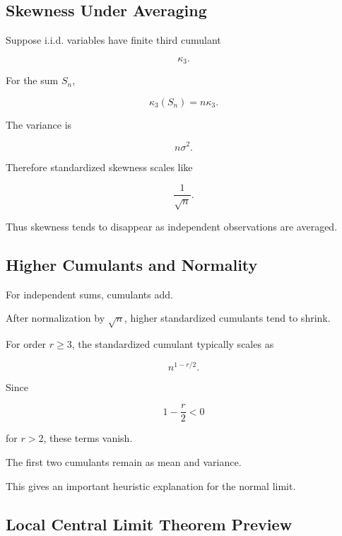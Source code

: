 \subsection{Skewness Under Averaging}
\label{subsec:skewness-under-averaging}

Suppose i.i.d. variables have finite third cumulant

\[
\kappa_3.
\]

For the sum \(S_n\),

\[
\kappa_3(S_n)
=
n\kappa_3.
\]

The variance is

\[
n\sigma^2.
\]

Therefore standardized skewness scales like

\[
\boxed{
\frac1{\sqrt{n}}.
}
\]

Thus skewness tends to disappear as independent observations are
averaged.

\subsection{Higher Cumulants and Normality}
\label{subsec:higher-cumulants-clt}

For independent sums, cumulants add.

After normalization by \(\sqrt{n}\), higher standardized cumulants tend
to shrink.

For order \(r\geq3\), the standardized cumulant typically scales as

\[
\boxed{
n^{1-r/2}.
}
\]

Since

\[
1-\frac r2<0
\]

for \(r>2\), these terms vanish.

The first two cumulants remain as mean and variance.

This gives an important heuristic explanation for the normal limit.

\subsection{Local Central Limit Theorem Preview}
\label{subsec:local-clt-preview}

